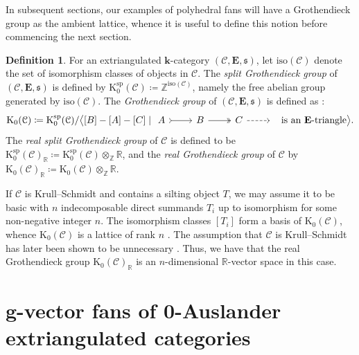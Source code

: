 \documentclass[10pt,twoside, a4paper,reqno]{amsart}
\newcommand{\sth}{\;\vert\;}
\newcommand{\R}{\mathbb{R}}
\newcommand{\calC}{\mathcal{C}}
\newcommand{\E}{\mathbf{E}}
\renewcommand{\k}{\mathbf{k}}
\newcommand{\K}{\mathrm{K}}
\newcommand{\Ksp}{\mathrm{K}^{\mathrm{sp}}}
\newcommand{\bfg}{\mathbf{g}}
\newcommand{\Z}{\mathbb{Z}}
\theoremstyle{definition}
\newtheorem{definition}[theorem]{Definition}
\begin{document}
In subsequent sections, our examples of polyhedral fans will have a Grothendieck group as the ambient lattice, whence it is useful to define this notion before commencing the next section.

\begin{definition}
For an extriangulated $\k$-category $(\calC,\E,\mathfrak{s})$, let $\mathrm{iso}(\calC)$ denote the set of isomorphism classes of objects in $\calC$. The \textit{split Grothendieck group} of $(\calC,\E,\mathfrak{s})$ is defined by
$\Ksp_0(\calC)\coloneqq \Z^{\mathrm{iso}(\calC)}$, namely the free abelian group generated by $\mathrm{iso}(\calC)$. The \textit{Grothendieck group} of $(\calC,\E,\mathfrak{s})$ is defined as \cite{ZZ21}:
\begin{equation*}
	\K_0(\calC) \coloneqq \Ksp_0(\calC) / \big\langle[B] - [A] - [C] \sth
	 \begin{tikzcd}
			A \arrow[r,tail] & B \arrow[r,two heads] & C \arrow[r,dashed] & {}
	\end{tikzcd}
	\text{ is an {$\E$-triangle}} \big\rangle.
\end{equation*}
The \textit{real split Grothendieck group} of $\calC$ is defined to be $\Ksp_0(\calC)_{\R}\coloneqq \Ksp_0(\calC)\otimes_\Z \R$, and the \textit{real Grothendieck group} of $\calC$ by $\K_0(\calC)_{\R}\coloneqq \K_0(\calC)\otimes_\Z \R$. \end{definition}

If $\calC$ is Krull--Schmidt and contains a silting object $T$, we may assume it to be basic with $n$ indecomposable direct summands $T_i$ up to isomorphism for some non-negative integer $n$. The isomorphism classes $[T_i]$ form a basis of $\K_0(\calC)$, whence $\K_0(\calC)$ is a lattice of rank $n$ \cite[{Thm.} 4.1]{AT23}. The assumption that $\calC$ is Krull--Schmidt has later been shown to be unnecessary \cite[Thm. A]{Wan25}. Thus, we have that the real Grothendieck group $\K_0(\calC)_{\R}$ is an $n$-dimensional $\R$-vector space in this case.

\section{\texorpdfstring{$\bfg$}{g}-vector fans of 0-Auslander extriangulated categories}\label{sec:fan}
\end{document}
